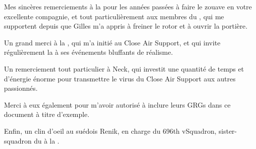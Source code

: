 %

Mes sincères remerciements à la \thirdwing{} pour les années passées à faire le zouave en votre excellente compagnie, et tout particulièrement aux membres du \rgt{} \inmem{}, qui me supportent depuis que Gilles m'a appris à freiner le rotor et à ouvrir la portière.

\vfil

Un grand merci à la \onethreetwo{}, qui m'a initié au Close Air Support, et qui invite régulièrement la \thirdwing{} à ses événements bluffants de réalisme.

\vfil

Un remerciement tout particulier à Neck, qui investit une quantité de temps et d'énergie énorme pour transmettre le virus du Close Air Support aux autres passionnés.

\vfil

Merci à eux également pour m'avoir autorisé à inclure leurs GRGs dans ce document à titre d'exemple.

\vfil

Enfin, un clin d'oeil au suédois Renik, en charge du 696th vSquadron, sister-squadron du \rgt{} à la \onethreetwo{}.

\vfil